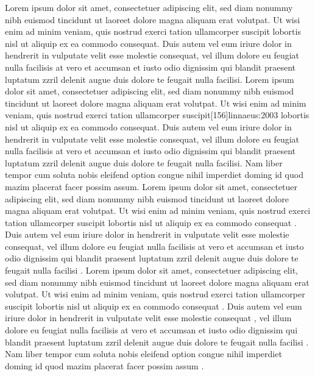 \documentclass[a4paper,12pt]{scrartcl}
\begin{document}
    {
        {Lorem ipsum dolor sit amet, consectetuer adipiscing elit, sed diam nonummy nibh euismod tincidunt ut laoreet dolore magna aliquam erat volutpat. Ut wisi enim ad minim veniam, quis nostrud exerci tation ullamcorper suscipit lobortis nisl ut aliquip ex ea commodo consequat.\autocite{auler:hiller:2015} Duis autem vel eum iriure dolor in hendrerit in vulputate velit esse molestie consequat, vel illum dolore eu feugiat nulla facilisis at vero et accumsan et iusto odio dignissim qui blandit praesent luptatum zzril delenit augue duis dolore te feugait nulla facilisi.\autocites[68]{auler:hiller:2011}[48]{auler:hiller:2015a}[159--187]{auler:hiller:2015}[40--41]{auler:hiller:2016}[15--23]{tacitus:1981}[19]{de:neck:yoder:1978}[69]{auler:hiller:2011} Lorem ipsum dolor sit amet, consectetuer adipiscing elit, sed diam nonummy nibh euismod tincidunt ut laoreet dolore magna aliquam erat volutpat. Ut wisi enim ad minim veniam\autocites[103]{ib:2016}[266--268]{boppert:1998}[108]{ib:2016}, quis nostrud exerci tation ullamcorper suscipit[156]{linnaeus:2003} lobortis nisl ut aliquip ex ea commodo consequat.\autocite{kenmore} Duis autem vel eum iriure dolor in hendrerit in vulputate velit esse molestie consequat, vel illum dolore eu feugiat nulla facilisis at vero et accumsan et iusto odio dignissim qui blandit praesent luptatum\autocite[103]{ib:2016} zzril delenit augue duis dolore te feugait nulla facilisi.\autocite{kenmore} Nam liber tempor cum soluta nobis eleifend\autocite[41--43]{auler:hiller:2015} option congue nihil imperdiet\autocite[19]{de:neck:yoder:1978} doming id quod mazim placerat facer possim assum.\autocite[145--146]{todorova:et:al:1981}}
        {
            {Lorem ipsum dolor sit amet, consectetuer adipiscing elit, sed diam nonummy nibh euismod tincidunt ut laoreet dolore magna aliquam erat volutpat. Ut wisi enim ad minim veniam, quis nostrud exerci tation ullamcorper suscipit lobortis nisl ut aliquip ex ea commodo consequat \autocite{auler:hiller:2015}. Duis autem vel eum iriure dolor in hendrerit in vulputate velit esse molestie consequat, vel illum dolore eu feugiat nulla facilisis at vero et accumsan et iusto odio dignissim qui blandit praesent luptatum zzril delenit augue duis dolore te feugait nulla facilisi \autocite{auler:hiller:2011,auler:hiller:2015a,auler:hiller:2015,auler:hiller:2016,tacitus:1981,de:neck:yoder:1978}. Lorem ipsum dolor sit amet, consectetuer adipiscing elit, sed diam nonummy nibh euismod tincidunt ut laoreet dolore magna aliquam erat volutpat. Ut wisi enim ad minim veniam, quis nostrud exerci tation ullamcorper suscipit  lobortis nisl ut aliquip ex ea commodo consequat \autocite{kenmore}. Duis autem vel eum iriure dolor in hendrerit in vulputate velit esse molestie consequat \autocites[73--75]{mueller:f:1991}[105--108]{mueller:a:1991}[68--70]{mueller:h:1900}[61]{mueller:har:1988}, vel illum dolore eu feugiat nulla facilisis at vero et accumsan et iusto odio dignissim qui blandit praesent luptatum zzril delenit augue duis dolore te feugait nulla facilisi \autocite{kenmore}. Nam liber tempor cum soluta nobis eleifend option congue nihil imperdiet doming id quod mazim placerat facer possim assum \autocite{todorova:et:al:1981}.}
            {}%
        }%
    }%
\end{document}
